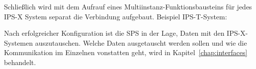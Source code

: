 
\pagebreak

Schließlich wird mit dem Aufrauf eines Multiinstanz-Funktionsbausteins für jedes IPS-X System separat die Verbindung aufgebaut. Beispiel IPS-T-System:\leer

\leer


Nach erfolgreicher Konfiguration ist die SPS in der Lage, Daten mit den IPS-X-Systemen auszutauschen. Welche Daten ausgetauscht werden sollen und wie die Kommunikation im Einzelnen vonstatten geht, wird in Kapitel~\ref{chap:interfaces} behandelt.

